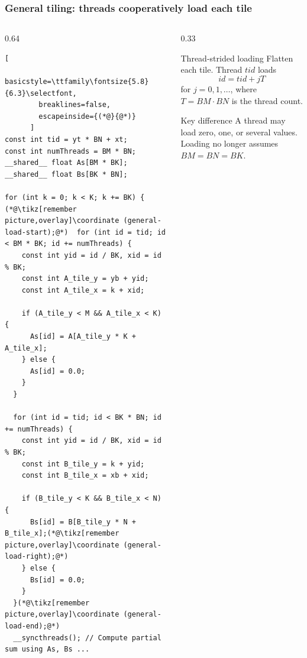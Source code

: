 \documentclass[../main.tex]{subfiles}
\begin{document}
\begin{frame}[fragile]
\end{frame}

\begin{frame}[fragile]
  \frametitle{General tiling: threads cooperatively load each tile}

  \begin{columns}[T,onlytextwidth]
    \begin{column}{0.64\textwidth}
      \begin{lstlisting}[
        basicstyle=\ttfamily\fontsize{5.8}{6.3}\selectfont,
        breaklines=false,
        escapeinside={(*@}{@*)}
      ]
const int tid = yt * BN + xt;
const int numThreads = BM * BN;
__shared__ float As[BM * BK];
__shared__ float Bs[BK * BN];

for (int k = 0; k < K; k += BK) {
(*@\tikz[remember picture,overlay]\coordinate (general-load-start);@*)  for (int id = tid; id < BM * BK; id += numThreads) {
    const int yid = id / BK, xid = id % BK;
    const int A_tile_y = yb + yid;
    const int A_tile_x = k + xid;

    if (A_tile_y < M && A_tile_x < K) {
      As[id] = A[A_tile_y * K + A_tile_x];
    } else {
      As[id] = 0.0;
    }
  }

  for (int id = tid; id < BK * BN; id += numThreads) {
    const int yid = id / BK, xid = id % BK;
    const int B_tile_y = k + yid;
    const int B_tile_x = xb + xid;

    if (B_tile_y < K && B_tile_x < N) {
      Bs[id] = B[B_tile_y * N + B_tile_x];(*@\tikz[remember picture,overlay]\coordinate (general-load-right);@*)
    } else {
      Bs[id] = 0.0;
    }
  }(*@\tikz[remember picture,overlay]\coordinate (general-load-end);@*)
  __syncthreads(); // Compute partial sum using As, Bs ...
      \end{lstlisting}
    \end{column}

    \begin{column}{0.33\textwidth}
      \begin{block}{Thread-strided loading}
        \small
        Flatten each tile. Thread $tid$ loads
        \[
          id=tid+jT
        \]
        for $j=0,1,\ldots$, where $T=BM\cdot BN$ is the thread count.
      \end{block}
      \begin{alertblock}{Key difference}
        \small
        A thread may load zero, one, or several values. Loading no longer
        assumes $BM=BN=BK$.
      \end{alertblock}
    \end{column}
  \end{columns}


\end{frame}
\end{document}
